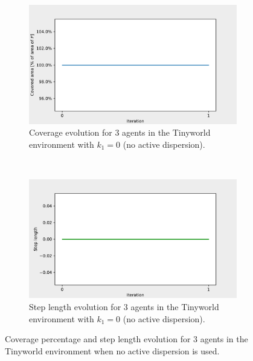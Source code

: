 \begin{figure}[H]
  \centering
  \begin{subfigure}[t]{0.5\textwidth}
    \centering
    \includegraphics[width=\textwidth]{figs/tinyworld_3_agnt_k_1_0_k_2_1_area_traj.pdf}
    \caption{Coverage evolution for 3 agents in the Tinyworld environment with $k_{1} = 0$ (no active dispersion).}
    \label{fig:3_agnt_tw_k_1_0_a_traj}
  \end{subfigure}%
  ~ 
  \begin{subfigure}[t]{0.5\textwidth}
    \centering
    \includegraphics[width=\textwidth]{figs/tinyworld_3_agnt_k_1_0_k_2_1_step_traj.pdf}
    \caption{Step length evolution for 3 agents in the Tinyworld environment with $k_{1} = 0$ (no active dispersion).}
    \label{fig:3_agnt_tw_k_1_0_s_traj}
  \end{subfigure}
  \caption{Coverage percentage and step length evolution for 3 agents in the Tinyworld environment when no active dispersion is used.}
  \label{fig:3_agnt_tw_evolution}
\end{figure}

